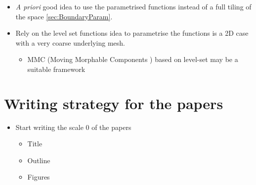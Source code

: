 \begin{itemize}
	\item \emph{A priori} good idea to use the parametrised functions instead of a full tiling of the space \cref{sec:BoundaryParam}.
	\item Rely on the level set functions idea to parametrise the functions is a 2D case with a very coarse underlying mesh.
	\begin{itemize}
		\item MMC (Moving Morphable Components \parencite{guo_doing_2014}) based on level-set may be a suitable framework
	\end{itemize}
\end{itemize}

\section{Writing strategy for the papers}

\begin{itemize}
	\item Start writing the scale 0 of the papers 
	\begin{itemize}
		\item Title 
		\item Outline
		\item Figures
	\end{itemize}
\end{itemize}